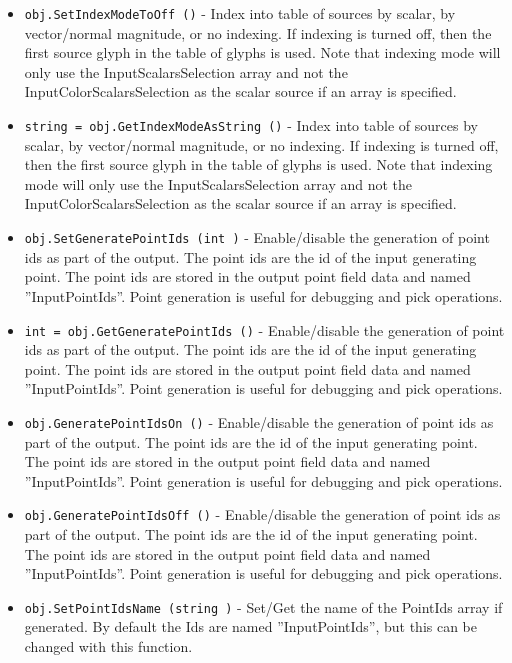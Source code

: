\begin{itemize}
\item  \verb|obj.SetIndexModeToOff ()| -  Index into table of sources by scalar, by vector/normal magnitude, or
 no indexing. If indexing is turned off, then the first source glyph in
 the table of glyphs is used. Note that indexing mode will only use the
 InputScalarsSelection array and not the InputColorScalarsSelection
 as the scalar source if an array is specified.

\item  \verb|string = obj.GetIndexModeAsString ()| -  Index into table of sources by scalar, by vector/normal magnitude, or
 no indexing. If indexing is turned off, then the first source glyph in
 the table of glyphs is used. Note that indexing mode will only use the
 InputScalarsSelection array and not the InputColorScalarsSelection
 as the scalar source if an array is specified.

\item  \verb|obj.SetGeneratePointIds (int )| -  Enable/disable the generation of point ids as part of the output. The
 point ids are the id of the input generating point. The point ids are
 stored in the output point field data and named ''InputPointIds''. Point
 generation is useful for debugging and pick operations.

\item  \verb|int = obj.GetGeneratePointIds ()| -  Enable/disable the generation of point ids as part of the output. The
 point ids are the id of the input generating point. The point ids are
 stored in the output point field data and named ''InputPointIds''. Point
 generation is useful for debugging and pick operations.

\item  \verb|obj.GeneratePointIdsOn ()| -  Enable/disable the generation of point ids as part of the output. The
 point ids are the id of the input generating point. The point ids are
 stored in the output point field data and named ''InputPointIds''. Point
 generation is useful for debugging and pick operations.

\item  \verb|obj.GeneratePointIdsOff ()| -  Enable/disable the generation of point ids as part of the output. The
 point ids are the id of the input generating point. The point ids are
 stored in the output point field data and named ''InputPointIds''. Point
 generation is useful for debugging and pick operations.

\item  \verb|obj.SetPointIdsName (string )| -  Set/Get the name of the PointIds array if generated. By default the Ids
 are named ''InputPointIds'', but this can be changed with this function.


\end{itemize}
